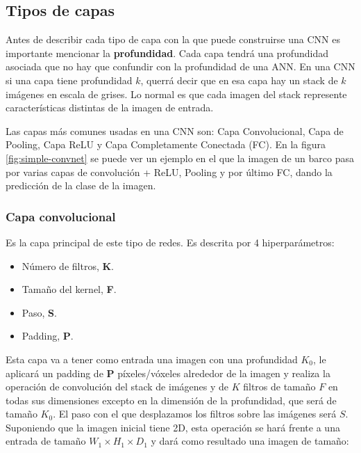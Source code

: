 
\subsection{Tipos de capas}

Antes de describir cada tipo de capa con la que puede construirse una CNN es importante mencionar la \textbf{profundidad}. Cada capa tendrá una profundidad asociada que no hay que confundir con la profundidad de una ANN. En una CNN si una capa tiene profundidad $k$, querrá decir que en esa capa hay un stack de $k$ imágenes en escala de grises. Lo normal es que cada imagen del stack represente características distintas de la imagen de entrada.

Las capas más comunes usadas en una CNN son: Capa Convolucional, Capa de Pooling, Capa ReLU y Capa Completamente Conectada (FC). En la figura \ref{fig:simple-convnet} \cite{missinglink2020} se puede ver un ejemplo en el que la imagen de un barco pasa por varias capas de convolución + ReLU, Pooling y por último FC, dando la predicción de la clase de la imagen.


\subsubsection{Capa convolucional}

Es la capa principal de este tipo de redes. Es descrita por 4 hiperparámetros:

\begin{itemize}
\item Número de filtros, \textbf{K}.
\item Tamaño del kernel, \textbf{F}.
\item Paso, \textbf{S}.
\item Padding, \textbf{P}.
\end{itemize}

Esta capa va a tener como entrada una imagen con una profundidad $K_0$, le aplicará un padding de \textbf{P} píxeles/vóxeles alrededor de la imagen y realiza la operación de convolución del stack de imágenes y de $K$ filtros de tamaño $F$ en todas sus dimensiones excepto en la dimensión de la profundidad, que será de tamaño $K_0$. El paso con el que desplazamos los filtros sobre las imágenes será $S$. Suponiendo que la imagen inicial tiene 2D, esta operación se hará frente a una entrada de tamaño $W_1 \times H_1 \times D_1$ y dará como resultado una imagen de tamaño:

